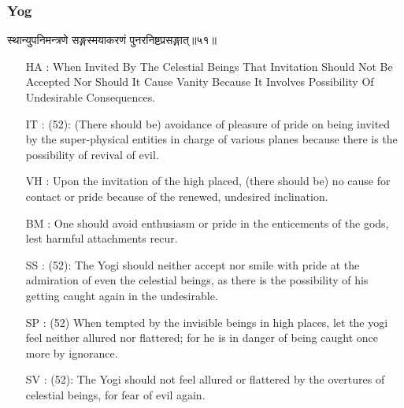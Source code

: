 \begin{frame}[fragile]\frametitle{Yog}
\begin{sanskrit}
स्थान्युपनिमन्त्रणे सङ्गस्मयाकरणं पुनरनिष्टप्रसङ्गात्॥५१॥
\end{sanskrit}

	\begin{itemize}
	\item [HA]: When Invited By The Celestial Beings That Invitation Should Not Be Accepted Nor Should It Cause Vanity Because It Involves Possibility Of Undesirable Consequences.
	\item [IT]: (52): (There should be) avoidance of pleasure of pride on being invited by the super-physical entities in charge of various planes because there is the possibility of revival of evil.
	\item [VH]: Upon the invitation of the high placed, (there should be) no cause for contact or pride because of the renewed, undesired inclination.
	\item [BM]: One should avoid enthusiasm or pride in the enticements of the gods, lest harmful attachments recur.
	\item [SS]: (52): The Yogi should neither accept nor smile with pride at the admiration of even the celestial beings, as there is the possibility of his getting caught again in the undesirable.
	\item [SP]: (52) When tempted by the invisible beings in high places, let the yogi feel neither allured nor flattered; for he is in danger of being caught once more by ignorance.
	\item [SV]: (52): The Yogi should not feel allured or flattered by the overtures of celestial beings, for fear of evil again. 
	\end{itemize}
\end{frame}


